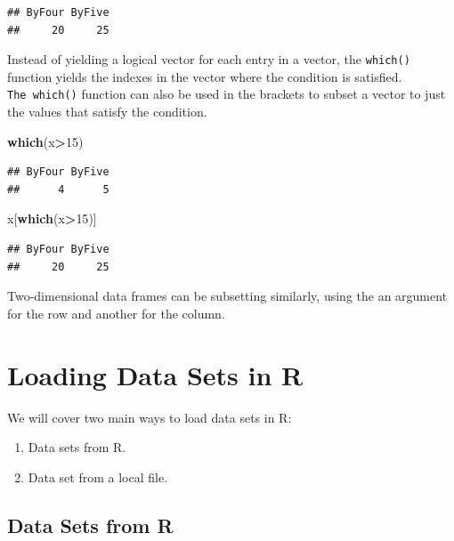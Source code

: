 \documentclass[
]{book}
\newenvironment{Shaded}{\begin{snugshade}}{\end{snugshade}}
\newcommand{\DecValTok}[1]{\textcolor[rgb]{0.00,0.00,0.81}{#1}}
\newcommand{\FunctionTok}[1]{\textcolor[rgb]{0.13,0.29,0.53}{\textbf{#1}}}
\newcommand{\NormalTok}[1]{#1}
\newcommand{\SpecialCharTok}[1]{\textcolor[rgb]{0.81,0.36,0.00}{\textbf{#1}}}
\providecommand{\tightlist}{%
  \setlength{\itemsep}{0pt}\setlength{\parskip}{0pt}}
\theoremstyle{definition}
\theoremstyle{definition}
\theoremstyle{definition}
\theoremstyle{definition}
\theoremstyle{remark}
\begin{document}
\begin{verbatim}
## ByFour ByFive 
##     20     25
\end{verbatim}

Instead of yielding a logical vector for each entry in a vector, the \texttt{which()} function yields the indexes in the vector where the condition is satisfied. \texttt{The\ which()} function can also be used in the brackets to subset a vector to just the values that satisfy the condition.

\begin{Shaded}
\begin{Highlighting}[]
\FunctionTok{which}\NormalTok{(x}\SpecialCharTok{\textgreater{}}\DecValTok{15}\NormalTok{)}
\end{Highlighting}
\end{Shaded}

\begin{verbatim}
## ByFour ByFive 
##      4      5
\end{verbatim}

\begin{Shaded}
\begin{Highlighting}[]
\NormalTok{x[}\FunctionTok{which}\NormalTok{(x}\SpecialCharTok{\textgreater{}}\DecValTok{15}\NormalTok{)]}
\end{Highlighting}
\end{Shaded}

\begin{verbatim}
## ByFour ByFive 
##     20     25
\end{verbatim}

Two-dimensional data frames can be subsetting similarly, using the an argument for the row and another for the column.

\hypertarget{Rdata}{%
\section{Loading Data Sets in R}\label{Rdata}}

We will cover two main ways to load data sets in R:

\begin{enumerate}
\def\labelenumi{\arabic{enumi}.}
\tightlist
\item
  Data sets from R.
\item
  Data set from a local file.
\end{enumerate}

\hypertarget{data-sets-from-r}{%
\subsection{Data Sets from R}\label{data-sets-from-r}}
\end{document}
